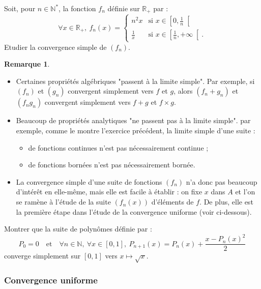 \documentclass[french]{article}
\newcommand{\N}{\mathbb{N}}
\newcommand{\R}{\mathbb{R}}
\newcommand{\st}{^*}
\theoremstyle{plain}
\theoremstyle{definition}
\newtheorem*{rmq}{Remarque}
\theoremstyle{remark}
\begin{document}
\begin{exo}
	Soit, pour $n\in\N\st$, la fonction $f_n$ définie sur $\R_+$ par :
	$$\forall x\in\R_+,\ f_n(x)=\begin{cases}
		\displaystyle n^2x&\text{si }x\in\displaystyle\left[0,\frac{1}{n}\right[\\[3mm]
		\displaystyle\frac{1}{x}&\displaystyle\text{si }x\in\left[\frac{1}{n},+\infty\right[.
	\end{cases}$$
	Etudier la convergence simple de $(f_n)$.
\end{exo}

\begin{rmq}
	\begin{itemize}
		\item Certaines propriétés algébriques "passent à la limite simple". Par exemple, si $(f_n)$ et $(g_n)$ convergent simplement vers $f$ et $g$, alors $(f_n+g_n)$ et $(f_n g_n)$ convergent simplement vers $f+g$ et $f\times g$.
		\item Beaucoup de propriétés analytiques "ne passent pas à la limite simple". par exemple, comme le montre l'exercice précédent, la limite simple d'une suite :
		\begin{itemize}[label=$\star$]
			\item de fonctions continues n'est pas nécessairement continue ;
			\item de fonctions bornées n'est pas nécessairement bornée.
		\end{itemize}
		\item La convergence simple d'une suite de fonctions $(f_n)$ n'a donc pas beaucoup d'intérêt en elle-même, mais elle est facile à établir : on fixe $x$ dans $A$ et l'on se ramène à l'étude de la suite $(f_n(x))$ d'éléments de $f$. De plus, elle est la première étape dans l'étude de la convergence uniforme (voir ci-dessous).
	\end{itemize}
\end{rmq}

\begin{exo}
	Montrer que la suite de polynômes définie par :
	$$P_0=0\quad\text{et}\quad\forall n\in\N,\ \forall x\in[0,1],\ P_{n+1}(x)=P_n(x)+\frac{x-P_n(x)^2}{2}$$ converge simplement sur $[0,1]$ vers $x\mapsto\sqrt{x}$.
\end{exo}

\subsubsection*{Convergence uniforme}
\end{document}
